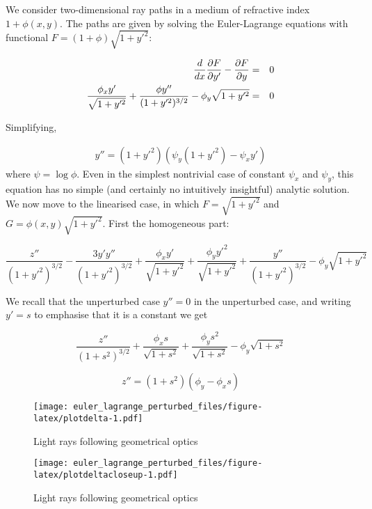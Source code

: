 \documentclass[pdflatex,sn-mathphys-num]{sn-jnl}%
\theoremstyle{thmstyleone}%
\theoremstyle{thmstyletwo}%
\theoremstyle{thmstylethree}%
\begin{document}
We consider two-dimensional ray paths in a medium of refractive index
$1+\phi(x,y)$.  The paths are given by solving the Euler-Lagrange
equations with functional $F=(1+\phi)\sqrt{1+y'^2}$:

\begin{eqnarray}
  \frac{d}{dx}\frac{\partial{F}}{\partial{y'}}-\frac{\partial{F}}{\partial{y}} &=& 0\nonumber\\
  \frac{\phi_x y'}{\sqrt{1+y'^2}}+\frac{\phi y''}{(1+y'^2)^{3/2}} -
  \phi_y\sqrt{1+y'^2} &=& 0
  \end{eqnarray}

Simplifying,

\begin{eqnarray}
  y'' = (1+y'^2)(\psi_y(1+y'^2) - \psi_xy')
\end{eqnarray}
%
where $\psi=\log\phi$.  Even in the simplest nontrivial case of
constant $\psi_x$ and $\psi_y$, this equation has no simple (and
certainly no intuitively insightful) analytic solution.  We now move
to the linearised case, in which $F=\sqrt{1+y'^2}$ and
$G=\phi(x,y)\sqrt{1+y'^2}$.  First the homogeneous part:

\begin{equation}
    \frac{z''}{(1+y'^2)^{3/2}}
  - \frac{3y'y''}{(1+y'^2)^{3/2}}
  + \frac{\phi_xy'}{\sqrt{1+y'^2}}
  + \frac{\phi_yy'^2}{\sqrt{1+y'^2}}
  + \frac{y''}{(1+y'^2)^{3/2}}-\phi_y\sqrt{1+y'^2}
\end{equation}


We recall that the unperturbed case $y''=0$ in the unperturbed case,
and writing $y'=s$ to emphasise that it is a constant we get

\begin{equation}
  \frac{z''}{(1+s^2)^{3/2}} +
  \frac{\phi_xs}{\sqrt{1+s^2}} + \frac{\phi_ys^2}{\sqrt{1+s^2}} -\phi_y\sqrt{1+s^2}
\end{equation}

\begin{equation}
  z'' = (1+s^2)(\phi_y-\phi_xs)
\end{equation}

\begin{figure}[h]
\centering
\texttt{[image: euler\_lagrange\_perturbed\_files/figure-latex/plotdelta-1.pdf]}
\caption{Light rays following geometrical optics}\label{plotdelta}
\end{figure}

\begin{figure}[h]
\centering
\texttt{[image: euler\_lagrange\_perturbed\_files/figure-latex/plotdeltacloseup-1.pdf]}
\caption{Light rays following geometrical optics}\label{plotdeltacloseup}
\end{figure}
\end{document}
